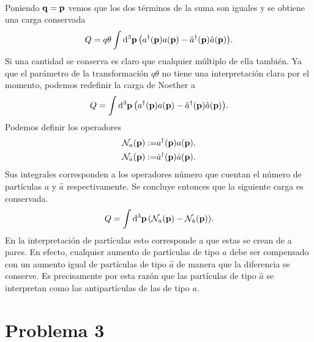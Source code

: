 \documentclass{article}
\begin{document}
\begin{enumerate}[(a)]
\begin{align}
\begin{split}
\end{split}
\end{align}
Poniendo $\vb{q}=\vb{p}$ vemos que los dos términos de la suma son iguales y se obtiene una carga conservada
\begin{equation}
Q=q\theta\int\dd[3]{\vb{p}}\qty(a^\dagger(\vb{p})a(\vb{p})-\hat{a}^\dagger(\vb{p})\hat{a}(\vb{p})).
\end{equation}
Si una cantidad se conserva es claro que cualquier múltiplo de ella también. Ya que el parámetro de la transformación $q\theta$ no tiene una interpretación clara por el momento, podemos redefinir la carga de Noether a 
\begin{equation}
Q=\int\dd[3]{\vb{p}}\qty(a^\dagger(\vb{p})a(\vb{p})-\hat{a}^\dagger(\vb{p})\hat{a}(\vb{p})).
\end{equation}
Podemos definir los operadores
\begin{align}
\begin{split}
\mathcal{N}_a(\vb{p}):=&a^\dagger(\vb{p})a(\vb{p}),\\
\mathcal{N}_{\hat{a}}(\vb{p}):=&\hat{a}^\dagger(\vb{p})\hat{a}(\vb{p}).
\end{split}
\end{align}
Sus integrales corresponden a los operadores número que cuentan el número de partículas $a$ y $\hat{a}$ respectivamente. Se concluye entonces que la siguiente carga es conservada.
\begin{equation}
Q=\int\dd[3]{\vb{p}}\qty(\mathcal{N}_a(\vb{p})-\mathcal{N}_{\hat{a}}(\vb{p})).
\end{equation}
En la interpretación de partículas esto corresponde a que estas se crean de a pares. En efecto, cualquier aumento de partículas de tipo $a$ debe ser compensado con un aumento igual de partículas de tipo $\hat{a}$ de manera que la diferencia se conserve. Es precisamente por esta razón que las partículas de tipo $\hat{a}$ se interpretan como las antipartículas de las de tipo $a$.

\end{enumerate}

\section*{Problema 3}
\end{document}
